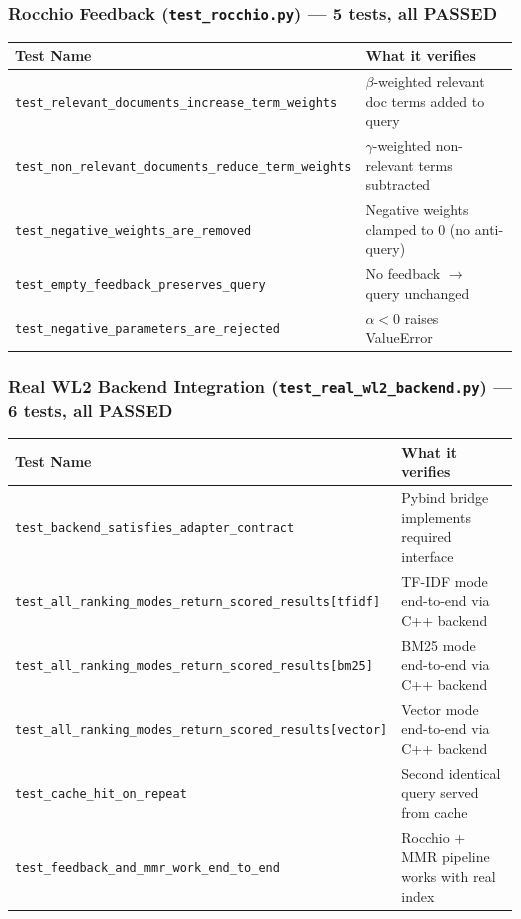 \documentclass[12pt]{article}
\begin{document}
\subsubsection*{Rocchio Feedback (\texttt{test\_rocchio.py}) --- 5 tests, all PASSED}
\begin{table}[H]
\centering
\footnotesize
\begin{tabular}{|p{7cm}|p{7.5cm}|}
\hline
\textbf{Test Name} & \textbf{What it verifies} \\
\hline
\texttt{test\_relevant\_documents\_increase\_term\_weights}    & $\beta$-weighted relevant doc terms added to query \\
\texttt{test\_non\_relevant\_documents\_reduce\_term\_weights} & $\gamma$-weighted non-relevant terms subtracted \\
\texttt{test\_negative\_weights\_are\_removed}                 & Negative weights clamped to 0 (no anti-query) \\
\texttt{test\_empty\_feedback\_preserves\_query}              & No feedback $\to$ query unchanged \\
\texttt{test\_negative\_parameters\_are\_rejected}            & $\alpha < 0$ raises ValueError \\
\hline
\end{tabular}
\end{table}

\subsubsection*{Real WL2 Backend Integration (\texttt{test\_real\_wl2\_backend.py}) --- 6 tests, all PASSED}
\begin{table}[H]
\centering
\footnotesize
\begin{tabular}{|p{7.5cm}|p{7cm}|}
\hline
\textbf{Test Name} & \textbf{What it verifies} \\
\hline
\texttt{test\_backend\_satisfies\_adapter\_contract}           & Pybind bridge implements required interface \\
\texttt{test\_all\_ranking\_modes\_return\_scored\_results[tfidf]}  & TF-IDF mode end-to-end via C++ backend \\
\texttt{test\_all\_ranking\_modes\_return\_scored\_results[bm25]}   & BM25 mode end-to-end via C++ backend \\
\texttt{test\_all\_ranking\_modes\_return\_scored\_results[vector]} & Vector mode end-to-end via C++ backend \\
\texttt{test\_cache\_hit\_on\_repeat}                          & Second identical query served from cache \\
\texttt{test\_feedback\_and\_mmr\_work\_end\_to\_end}          & Rocchio + MMR pipeline works with real index \\
\hline
\end{tabular}
\end{table}
\end{document}
